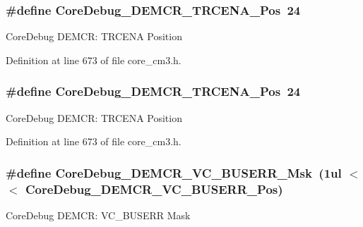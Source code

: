 \subsubsection[{\texorpdfstring{Core\+Debug\+\_\+\+D\+E\+M\+C\+R\+\_\+\+T\+R\+C\+E\+N\+A\+\_\+\+Pos}{CoreDebug_DEMCR_TRCENA_Pos}}]{\setlength{\rightskip}{0pt plus 5cm}\#define Core\+Debug\+\_\+\+D\+E\+M\+C\+R\+\_\+\+T\+R\+C\+E\+N\+A\+\_\+\+Pos~24}\hypertarget{group___c_m_s_i_s___c_m3___core_debug_ga6ff2102b98f86540224819a1b767ba39}{}\label{group___c_m_s_i_s___c_m3___core_debug_ga6ff2102b98f86540224819a1b767ba39}
Core\+Debug D\+E\+M\+CR\+: T\+R\+C\+E\+NA Position 

Definition at line 673 of file core\+\_\+cm3.\+h.

\subsubsection[{\texorpdfstring{Core\+Debug\+\_\+\+D\+E\+M\+C\+R\+\_\+\+T\+R\+C\+E\+N\+A\+\_\+\+Pos}{CoreDebug_DEMCR_TRCENA_Pos}}]{\setlength{\rightskip}{0pt plus 5cm}\#define Core\+Debug\+\_\+\+D\+E\+M\+C\+R\+\_\+\+T\+R\+C\+E\+N\+A\+\_\+\+Pos~24}\hypertarget{group___c_m_s_i_s___c_m3___core_debug_ga6ff2102b98f86540224819a1b767ba39}{}\label{group___c_m_s_i_s___c_m3___core_debug_ga6ff2102b98f86540224819a1b767ba39}
Core\+Debug D\+E\+M\+CR\+: T\+R\+C\+E\+NA Position 

Definition at line 673 of file core\+\_\+cm3.\+h.

\subsubsection[{\texorpdfstring{Core\+Debug\+\_\+\+D\+E\+M\+C\+R\+\_\+\+V\+C\+\_\+\+B\+U\+S\+E\+R\+R\+\_\+\+Msk}{CoreDebug_DEMCR_VC_BUSERR_Msk}}]{\setlength{\rightskip}{0pt plus 5cm}\#define Core\+Debug\+\_\+\+D\+E\+M\+C\+R\+\_\+\+V\+C\+\_\+\+B\+U\+S\+E\+R\+R\+\_\+\+Msk~(1ul $<$$<$ Core\+Debug\+\_\+\+D\+E\+M\+C\+R\+\_\+\+V\+C\+\_\+\+B\+U\+S\+E\+R\+R\+\_\+\+Pos)}\hypertarget{group___c_m_s_i_s___c_m3___core_debug_ga9d29546aefe3ca8662a7fe48dd4a5b2b}{}\label{group___c_m_s_i_s___c_m3___core_debug_ga9d29546aefe3ca8662a7fe48dd4a5b2b}
Core\+Debug D\+E\+M\+CR\+: V\+C\+\_\+\+B\+U\+S\+E\+RR Mask 

